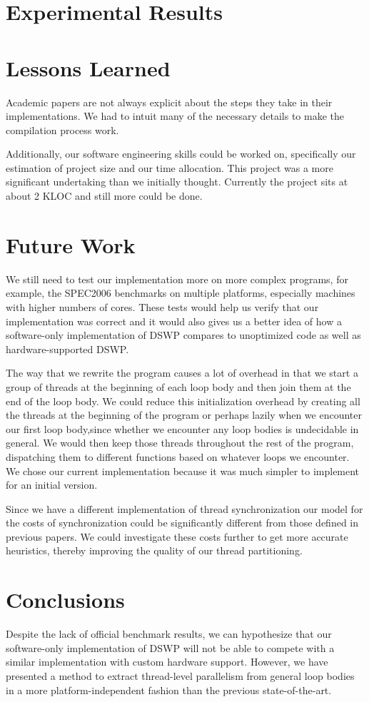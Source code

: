 \documentclass[11pt]{article}
\begin{document}
\section{Experimental Results}


\section{Lessons Learned}
Academic papers are not always explicit about the steps they take in their implementations.  We had to intuit many of the necessary details to make the compilation process work.

Additionally, our software engineering skills could be worked on, specifically our estimation of project size and our time allocation.  This project was a more significant undertaking than we initially thought.  Currently the project sits at about 2 KLOC and still more could be done.  

\section{Future Work}
We still need to test our implementation more on more complex programs, for example, the SPEC2006 benchmarks on multiple platforms, especially machines with higher numbers of cores.  These tests would help us verify that our implementation was correct and it would also gives us a better idea of how a software-only implementation of DSWP compares to unoptimized code as well as hardware-supported DSWP.

The way that we rewrite the program causes a lot of overhead in that we start a group of threads at the beginning of each loop body and then join them at the end of the loop body.  We could reduce this initialization overhead by creating all the threads at the beginning of the program or perhaps lazily when we encounter our first loop body,since whether we encounter any loop bodies is undecidable in general.  We would then keep those threads throughout the rest of the program, dispatching them to different functions based on whatever loops we encounter.  We chose our current implementation because it was much simpler to implement for an initial version.

Since we have a different implementation of thread synchronization our model for the costs of synchronization could be significantly different from those defined in previous papers.  We could investigate these costs further to get more accurate heuristics, thereby improving the quality of our thread partitioning.

\section{Conclusions}
Despite the lack of official benchmark results, we can hypothesize that our software-only implementation of DSWP will not be able to compete with a similar implementation with custom hardware support.  However, we have presented a method to extract thread-level parallelism from general loop bodies in a more platform-independent fashion than the previous state-of-the-art.
\end{document}
